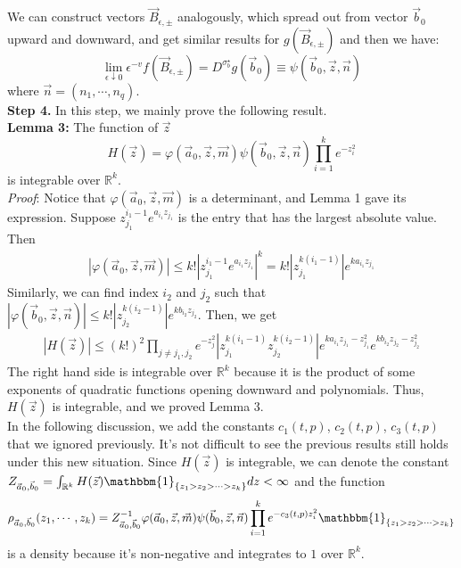 \documentclass[12pt]{article}
\begin{document}
We can construct vectors $\vec{B}_{\epsilon,\pm}$ analogously, which spread out from vector $\vec{b}_{0}$ upward and downward, and get similar results for $g(\vec{B}_{\epsilon,\pm})$ and then we have:
$$\lim_{\epsilon\downarrow 0}\epsilon^{-v}f(\vec{B}_{\epsilon,\pm})=D^{\sigma_{b}^{\star}}g(\vec{b}_{0})\equiv\psi(\vec{b}_{0},\vec{z},\vec{n})$$
where $\vec{n}=(n_{1},\cdots,n_{q})$.\\
\textbf{Step 4. }In this step, we mainly prove the following result.\\
\textbf{Lemma 3:} The function of $\vec{z}$ $$H(\vec{z})=\varphi(\vec{a}_{0},\vec{z},\vec{m})\psi(\vec{b}_{0},\vec{z},\vec{n})\prod_{i=1}^{k}e^{-z_{i}^{2}}$$ is integrable over $\mathbb{R}^{k}$.\\
\emph{Proof}: Notice that $\varphi(\vec{a}_{0},\vec{z},\vec{m})$ is a determinant, and Lemma 1 gave its expression. Suppose $z_{j_1}^{i_1-1}e^{a_{i_1}z_{j_1}}$ is the entry that has the largest absolute value. Then 
\begin{align*}
	|\varphi(\vec{a}_{0},\vec{z},\vec{m})|\leqslant k!|z_{j_{1}}^{i_{1}-1}e^{a_{i_1}z_{j_1}}|^{k}=k!|z_{j_1}^{k(i_1-1)}|e^{ka_{i_1}z_{j_1}}
\end{align*}
Similarly, we can find index $i_2$ and $j_{2}$ such that $|\varphi(\vec{b}_{0},\vec{z},\vec{n})|\leqslant k!|z_{j_2}^{k(i_2-1)}|e^{kb_{i_2}z_{j_2}}$. Then, we get 
\begin{align*}
	|H(\vec{z})|\leqslant (k!)^{2}\prod_{j\neq j_1,j_2}e^{-z_{j}^{2}}|z_{j_1}^{k(i_1-1)}z_{j_2}^{k(i_2-1)}|e^{ka_{i_1}z_{j_1}-z_{j_1}^2}e^{kb_{i_2}z_{j_2}-z_{j_2}^{2}}
\end{align*}
The right hand side is integrable over $\mathbb{R}^{k}$ because it is the product of some exponents of quadratic functions opening downward and polynomials. Thus, $H(\vec{z})$ is integrable, and we proved Lemma 3.\\
In the following discussion, we add the constants $c_{1}(t,p)$, $c_{2}(t,p)$, $c_{3}(t,p)$ that we ignored previously. It's not difficult to see the previous results still holds under this new situation. Since $H(\vec{z})$ is integrable, we can denote the constant $Z_{\vec{a}_{0},\vec{b}_{0}}=\int_{\mathbb{R}^{k}}H(\vec{z})\mathbbm{1}_{\{z_1>z_2>\cdots>z_{k}\}}dz<\infty$ and the function $$\rho_{\vec{a}_{0},\vec{b}_{0}}(z_{1},\cdots,z_{k})=Z_{\vec{a}_{0},\vec{b}_{0}}^{-1}\varphi(\vec{a}_{0},\vec{z},\vec{m})\psi(\vec{b}_{0},\vec{z},\vec{n})\prod_{i=1}^{k}e^{-c_{3}(t,p)z_{i}^{2}}\mathbbm{1}_{\{z_1>z_2>\cdots>z_{k}\}}$$
is a density because it's non-negative and integrates to $1$ over $\mathbb{R}^{k}$.\\
\end{document}
